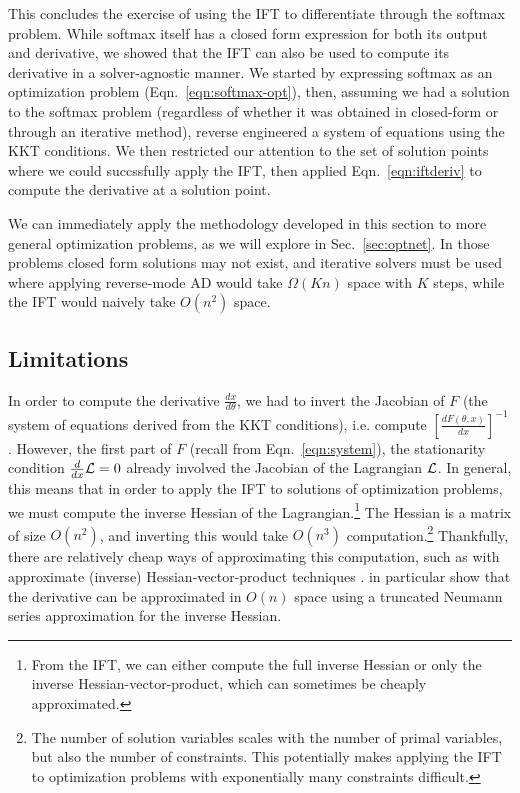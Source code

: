 \documentclass[11pt]{article}
\begin{document}
This concludes the exercise of using the IFT to differentiate through the softmax problem.
While softmax itself has a closed form expression for both its output and derivative,
we showed that the IFT can also be used to compute its derivative in a solver-agnostic manner.
We started by expressing softmax as an optimization problem (Eqn.~\ref{eqn:softmax-opt}),
then, assuming we had a solution to the softmax problem (regardless of whether it was obtained
in closed-form or through an iterative method),
reverse engineered a system of equations using the KKT conditions.
We then restricted our attention to the set of solution points where we could succssfully
apply the IFT,
then applied Eqn.~\ref{eqn:iftderiv} to compute the derivative at a solution point.

We can immediately apply the methodology developed in this section to more general
optimization problems, as we will explore in Sec.~\ref{sec:optnet}.
In those problems closed form solutions may not exist, and iterative solvers must be used
where applying reverse-mode AD would take $\Omega(Kn)$ space with $K$ steps,
while the IFT would naively take $O(n^2)$ space.


\subsection{Limitations}
\label{sec:limitations}
In order to compute the derivative $\frac{dx}{d\theta}$, we had to invert the Jacobian of $F$
(the system of equations derived from the KKT conditions),
i.e. compute $\left[\frac{dF(\theta,x)}{dx}\right]^{-1}$.
However, the first part of $F$ (recall from Eqn.~\ref{eqn:system}), the stationarity condition
$\frac{d}{dx}\mathcal{L} = 0$
already involved the Jacobian of the Lagrangian $\mathcal{L}$.
In general, this means that in order to apply the IFT to solutions of optimization problems,
we must compute the inverse Hessian of the Lagrangian.\footnote{
From the IFT, we can either compute the full inverse Hessian or only the
inverse Hessian-vector-product, which can sometimes be cheaply approximated.
}
The Hessian is a matrix of size $O(n^2)$,
and inverting this would take $O(n^3)$ computation.\footnote{
The number of solution variables scales with the number of primal variables,
but also the number of constraints.
This potentially makes applying the IFT to optimization problems with exponentially
many constraints difficult.
}
Thankfully, there are relatively cheap ways of approximating this computation,
such as with approximate (inverse) Hessian-vector-product techniques
\citep{rajeswaran2019imaml,lorraine2019hoift}.
\citet{lorraine2019hoift} in particular show that the derivative can be approximated
in $O(n)$ space using a truncated Neumann series approximation for the inverse Hessian.
\end{document}
